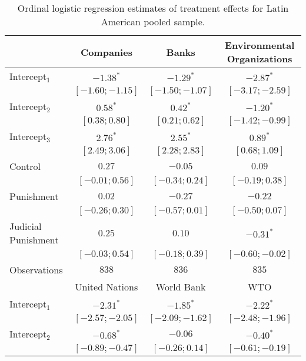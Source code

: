 \begin{table}[h]
\begin{center}
\caption{Ordinal logistic regression estimates of treatment effects for Latin American pooled sample.}
\begin{threeparttable}
\begin{tabular}{l c c c}
\hline
 & Companies & Banks & Environmental
Organizations \\
\hline
Intercept$_1$       & $-1.38^{*}$       & $-1.29^{*}$       & $-2.87^{*}$       \\
                    & $ [-1.60; -1.15]$ & $ [-1.50; -1.07]$ & $ [-3.17; -2.59]$ \\
Intercept$_2$       & $0.58^{*}$        & $0.42^{*}$        & $-1.20^{*}$       \\
                    & $ [ 0.38;  0.80]$ & $ [ 0.21;  0.62]$ & $ [-1.42; -0.99]$ \\
Intercept$_3$       & $2.76^{*}$        & $2.55^{*}$        & $0.89^{*}$        \\
                    & $ [ 2.49;  3.06]$ & $ [ 2.28;  2.83]$ & $ [ 0.68;  1.09]$ \\
Control             & $0.27$            & $-0.05$           & $0.09$            \\
                    & $ [-0.01;  0.56]$ & $ [-0.34;  0.24]$ & $ [-0.19;  0.38]$ \\
Punishment          & $0.02$            & $-0.27$           & $-0.22$           \\
                    & $ [-0.26;  0.30]$ & $ [-0.57;  0.01]$ & $ [-0.50;  0.07]$ \\
Judicial Punishment & $0.25$            & $0.10$            & $-0.31^{*}$       \\
                    & $ [-0.03;  0.54]$ & $ [-0.18;  0.39]$ & $ [-0.60; -0.02]$ \\
\hline
Observations        & $838$             & $836$             & $835$             \\
\hline
 & United Nations & World Bank & WTO \\
\hline
Intercept$_1$       & $-2.31^{*}$       & $-1.85^{*}$       & $-2.22^{*}$       \\
                    & $ [-2.57; -2.05]$ & $ [-2.09; -1.62]$ & $ [-2.48; -1.96]$ \\
Intercept$_2$       & $-0.68^{*}$       & $-0.06$           & $-0.40^{*}$       \\
                    & $ [-0.89; -0.47]$ & $ [-0.26;  0.14]$ & $ [-0.61; -0.19]$ \\

\end{tabular}
\end{threeparttable}
\end{center}
\end{table}
